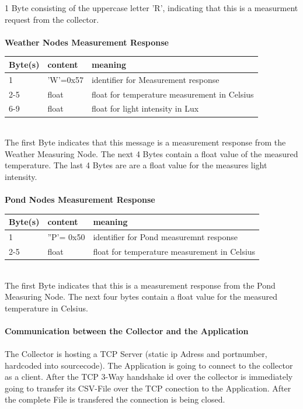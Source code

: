 \documentclass[
	11pt,
	a4paper
]{article}%
\begin{document}
1 Byte consisting of the uppercase letter 'R', indicating that this is a measurment request from the collector.
\\\\
\textbf{Weather Nodes Measurement Response}
\begin{table}[h]
    \begin{tabular}{|l|l|l|}
    \hline
    \rowcolor{dunkelgrau}
    Byte(s) & content  & meaning                                      \\ \hline
    1       & 'W'=0x57 & identifier for Measurement response          \\ \hline
    2-5     & float    & float for temperature measurement in Celsius \\
    6-9     & float    & float for light intensity in Lux             \\
    \end{tabular}
\end{table}\\
The first Byte indicates that this message is a measurement response from the Weather Measuring Node. The next 4 Bytes contain a float value of the measured temperature. The last 4 Bytes are are a float value for the measures light intensity.
\\\\
\textbf{Pond Nodes Measurement Response}
\begin{table}[h]
    \begin{tabular}{|l|l|l|}
    \hline
    \rowcolor{dunkelgrau}
    Byte(s) & content  		& meaning                            \\ \hline
    1       & ''P'= 0x50 	& identifier for Pond measuremnt response \\ \hline
    2-5		& float			& float for temperature measurement in Celsius \\ \hline
    \end{tabular}
\end{table}\\
The first Byte indicates that this is a measurement response from the Pond Measuring Node. The next four bytes contain a float value for the measured temperature in Celsius.
\\\\
\textbf{Communication between the Collector and the Application}\\\\
The Collector is hosting a TCP Server (static ip Adress and portnumber, hardcoded into sourcecode). The Application is going to connect to the collector as a client. After the TCP 3-Way handshake id over the collector is immediately going to transfer its CSV-File over the TCP conection to the Application. After the complete File is transfered the connection is being closed.
\end{document}
